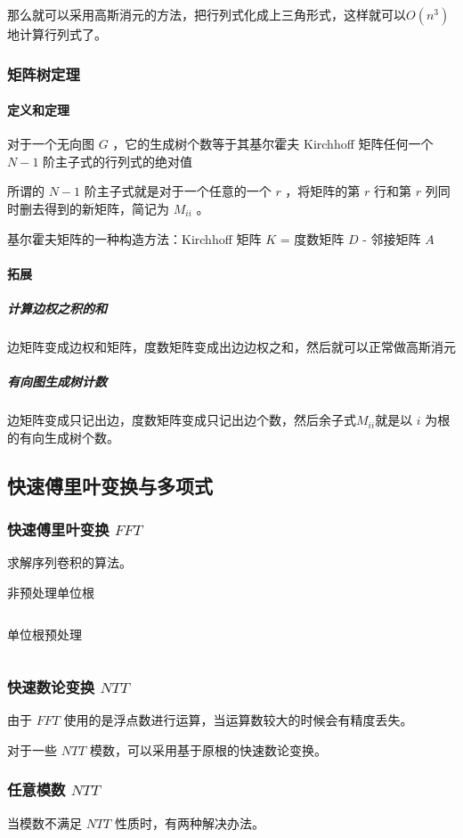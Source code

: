 \documentclass[UTF-8]{ctexart}
\newcommand{\cpp}[1]{\inputminted[bgcolor=bg,breaklines,breakanywhere=true]{c++}{#1}}
\begin{document}
			那么就可以采用高斯消元的方法，把行列式化成上三角形式，这样就可以$O(n^3)$地计算行列式了。
			\subsubsection{矩阵树定理}
			\paragraph{定义和定理} 对于一个无向图 $G$ ，它的生成树个数等于其基尔霍夫 Kirchhoff 矩阵任何一个 $N-1$ 阶主子式的行列式的绝对值  
			
			所谓的 $N-1$ 阶主子式就是对于一个任意的一个 $r$ ，将矩阵的第 $r$ 行和第 $r$ 列同时删去得到的新矩阵，简记为 $M _ {ii}$ 。
			
			基尔霍夫矩阵的一种构造方法：Kirchhoff 矩阵 $K$ = 度数矩阵 $D$ - 邻接矩阵 $A$
			
			\paragraph{拓展}
			\subparagraph{计算边权之积的和} 边矩阵变成边权和矩阵，度数矩阵变成出边边权之和，然后就可以正常做高斯消元
			
			\subparagraph{有向图生成树计数} 边矩阵变成只记出边，度数矩阵变成只记出边个数，然后余子式$M _ {ii}$就是以 $i$ 为根的有向生成树个数。
	
		\subsection{快速傅里叶变换与多项式}
			\subsubsection{快速傅里叶变换 $FFT$}
			求解序列卷积的算法。
			
			非预处理单位根
			\cpp{code//Math//fft-unpre.cpp}
    		单位根预处理
    		\cpp{code//Math//fft-pre.cpp}
			\subsubsection{快速数论变换 $NTT$}
			由于 $FFT$ 使用的是浮点数进行运算，当运算数较大的时候会有精度丢失。
			
			对于一些 $NTT$ 模数，可以采用基于原根的快速数论变换。
			\subsubsection{任意模数 $NTT$}
			当模数不满足 $NTT$ 性质时，有两种解决办法。
	
\end{document}
